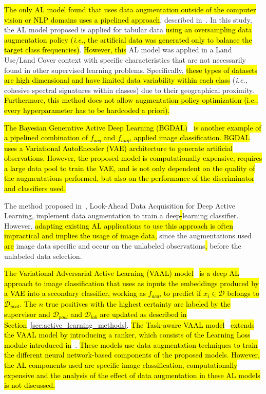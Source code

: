 \documentclass[preprint, 12pt]{elsarticle}
\begin{document}
\hl{The only AL model found that uses data augmentation outside of the
computer vision or NLP domains uses a pipelined approach}, described
in~\cite{Fonseca2021}. In this study, the AL model proposed is applied for
tabular data \hl{using an oversampling data augmentation policy
(\textit{i.e.}, the artificial data was generated only to balance the target
class frequencies)}. \hl{However, this} AL model was applied in a Land
Use/Land Cover context with specific characteristics that are not necessarily
found in other supervised learning problems. Specifically, \hl{these types of
datasets are high dimensional and have limited data variability within each
class} (\textit{i.e.,} cohesive spectral signatures within classes) due to
their geographical proximity. \hl{Furthermore, this method does not allow
augmentation policy optimization (i.e., every hyperparameter has to be
hardcoded a priori).}

\hl{The Bayesian Generative Active Deep Learning
(BGDAL)}~\cite{tran2019bayesian} \hl{is another example of a pipelined
combination of $f_{acq}$ and $f_{aug}$, applied image classification. BGDAL
uses a Variational AutoEncoder (VAE) architecture to generate artificial
observations. However, the proposed model is computationally expensive,
requires a large data pool to train the VAE, and is not only dependent on the
quality of the augmentations performed, but also on the performance of the
discriminator and classifiers used.}

The method proposed in~\cite{Kim2021}, Look-Ahead Data Acquisition for Deep
Active Learning, implement data augmentation to train a deep\hl{-}learning
classifier. However, \hl{adapting existing AL applications to use this
approach is often impractical and implies the usage of image data,} since the
augmentations used \hl{are} image data specific and occur on the unlabeled
observations\hl{,} before the unlabeled data selection.

\hl{The Variational Adversarial Active Learning (VAAL)
model}~\cite{sinha2019variational} \hl{is a deep AL approach to image
classification that uses as inputs the embeddings produced by a VAE into a
secondary classifier, working as $f_{acq}$, to predict if $x_i \in
\mathcal{D}$ belongs to $\mathcal{D}_{pool}$. The $n$ true positives with the
highest certainty are labeled by the supervisor and $\mathcal{D}_{pool}$ and
$\mathcal{D}_{lab}$ are updated as described in
Section}~\ref{sec:active_learning_methods}. \hl{The Task-aware VAAL
model}~\cite{kim2021task} \hl{extends the VAAL model by introducing a ranker,
which consists of the Learning Loss module introduced in}~\cite{Yoo2019}.
\hl{These models use data augmentation techniques to train the different
neural network-based components of the proposed models. However, the AL
components used are specific image classification, computationally expensive
and the analysis of the effect of data augmentation in these AL models is not
discussed.}
\end{document}
